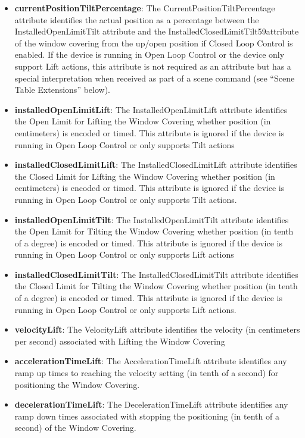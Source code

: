 \begin{itemize}
\item \textbf{currentPositionTiltPercentage}: The CurrentPositionTiltPercentage attribute identifies the actual position as a percentage between the InstalledOpenLimitTilt attribute and the InstalledClosedLimitTilt59attribute of the window covering from the up/open position if Closed Loop Control is enabled. If the device is running in Open Loop Control or the device only support Lift actions, this attribute is not required as an attribute but has a special interpretation when received as part of a scene command (see “Scene Table Extensions” below).
\item \textbf{installedOpenLimitLift}: The InstalledOpenLimitLift attribute identifies the Open Limit for Lifting the Window Covering whether position (in centimeters) is encoded or timed. This attribute is ignored if the device is running in Open Loop Control or only supports Tilt actions
\item \textbf{installedClosedLimitLift}: The InstalledClosedLimitLift attribute identifies the Closed Limit for Lifting the Window Covering whether position (in centimeters) is encoded or timed. This attribute is ignored if the device is running in Open Loop Control or only supports Tilt actions.
\item \textbf{installedOpenLimitTilt}: The InstalledOpenLimitTilt attribute identifies the Open Limit for Tilting the Window Covering whether position (in tenth of a degree) is encoded or timed. This attribute is ignored if the device is running in Open Loop Control or only supports Lift actions
\item \textbf{installedClosedLimitTilt}: The InstalledClosedLimitTilt attribute identifies the Closed Limit for Tilting the Window Covering whether position (in tenth of a degree) is encoded or timed. This attribute is ignored if the device is running in Open Loop Control or only supports Lift actions.
\item \textbf{velocityLift}: The VelocityLift attribute identifies the velocity (in centimeters per second) associated with Lifting the Window Covering
\item \textbf{accelerationTimeLift}: The AccelerationTimeLift attribute identifies any ramp up times to reaching the velocity setting (in tenth of a second) for positioning the Window Covering.
\item \textbf{decelerationTimeLift}: The DecelerationTimeLift attribute identifies any ramp down times associated with stopping the positioning (in tenth of a second) of the Window Covering.

\end{itemize}
